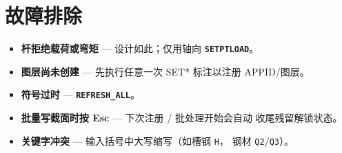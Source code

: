 \documentclass[a4paper]{ltxdoc}
\newcommand{\cadcmd}[1]{\texttt{\textbf{#1}}}
\begin{document}
\section{故障排除}

\begin{itemize}[nosep]
  \item \textbf{杆拒绝载荷或弯矩} --- 设计如此；仅用轴向
        \cadcmd{SETPTLOAD}。
  \item \textbf{图层尚未创建} --- 先执行任意一次 SET* 标注以注册
        APPID/图层。
  \item \textbf{符号过时} --- \cadcmd{REFRESH\_ALL}。
  \item \textbf{批量写截面时按 Esc} --- 下次注册 / 批处理开始会自动
        收尾残留解锁状态。
  \item \textbf{关键字冲突} --- 输入括号中大写缩写（如槽钢 \texttt{H}，
        钢材 \texttt{Q2}/\texttt{Q3}）。
\end{itemize}
\end{document}
